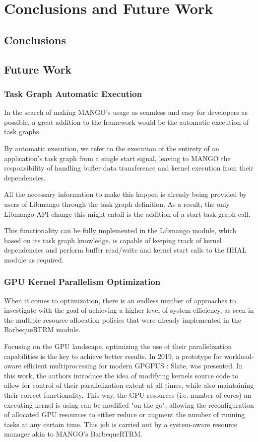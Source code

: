\chapter{Conclusions and Future Work} \label{ch:Conclusions}

\section{Conclusions}

\section{Future Work}
\subsection{Task Graph Automatic Execution}

In the search of making MANGO's usage as seamless and easy for developers as possible, a great addition to the framework would be the automatic execution of task graphs. 

By automatic execution, we refer to the execution of the entirety of an application's task graph from a single start signal, leaving to MANGO the responsibility of handling buffer data transference and kernel execution from their dependencies.

All the necessary information to make this happen is already being provided by users of Libmango through the task graph definition. As a result, the only Libmango API change this might entail is the addition of a start task graph call.

This functionality can be fully implemented in the Libmango module, which based on its task graph knowledge, is capable of keeping track of kernel dependencies and perform buffer read/write and kernel start calls to the HHAL module as required.

\subsection{GPU Kernel Parallelism Optimization}

When it comes to optimization, there is an endless number of approaches to investigate with the goal of achieving a higher level of system efficiency, as seen in the multiple resource allocation policies that were already implemented in the BarbequeRTRM module.

Focusing on the GPU landscape, optimizing the use of their parallelization capabilities is the key to achieve better results. In 2019, a prototype for workload-aware efficient multiprocessing for modern GPGPUS \cite{slate}: Slate, was presented.
In this work, the authors introduce the idea of modifying kernels source code to allow for control of their parallelization extent at all times, while also maintaining their correct functionality. This way, the GPU resources (i.e. number of cores) an executing kernel is using can be modified "on the go", allowing the reconfiguration of allocated GPU resources to either reduce or augment the number of running tasks at any certain time. This job is carried out by a system-aware resource manager akin to MANGO's BarbequeRTRM.

